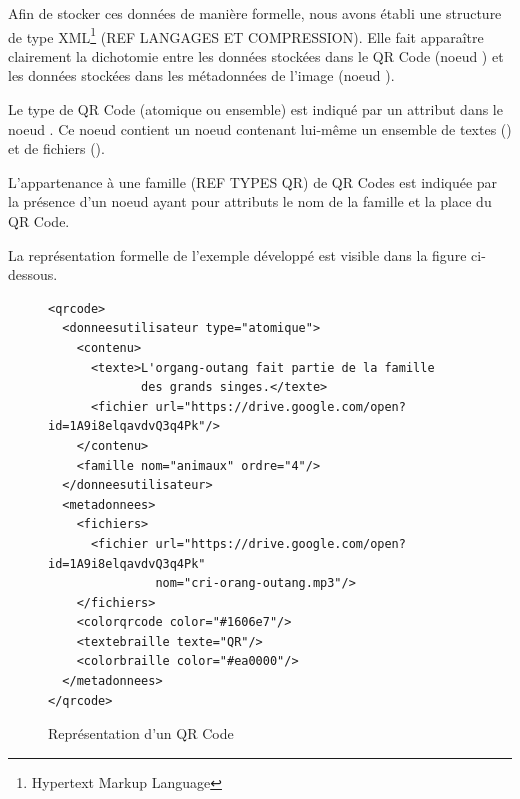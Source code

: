 \newpage
\par
Afin de stocker ces données de manière formelle, nous avons établi une structure de type XML\footnote{Hypertext Markup Language} (REF LANGAGES ET COMPRESSION). Elle fait apparaître clairement la dichotomie entre les données stockées dans le QR Code (noeud ) et les données stockées dans les métadonnées de l'image (noeud ).\\

\par
Le type de QR Code (atomique ou ensemble) est indiqué par un attribut dans le noeud . Ce noeud contient un noeud  contenant lui-même un ensemble de textes () et de fichiers ().
\par
L'appartenance à une famille (REF TYPES QR) de QR Codes est indiquée par la présence d'un noeud  ayant pour attributs le nom de la famille et la place du QR Code.\\

\par
La représentation formelle de l'exemple développé est visible dans la figure ci-dessous.

\begin{figure}[!h]
\begin{adjustbox}{minipage=\textwidth,bgcolor={RGB}{240 240 240}}

\lstset{language=XML}

\begin{lstlisting}
<qrcode>
  <donneesutilisateur type="atomique">
    <contenu>
      <texte>L'organg-outang fait partie de la famille 
             des grands singes.</texte>
      <fichier url="https://drive.google.com/open?id=1A9i8elqavdvQ3q4Pk"/>
    </contenu>
    <famille nom="animaux" ordre="4"/>
  </donneesutilisateur>
  <metadonnees>
    <fichiers>
      <fichier url="https://drive.google.com/open?id=1A9i8elqavdvQ3q4Pk"
               nom="cri-orang-outang.mp3"/>
    </fichiers>
    <colorqrcode color="#1606e7"/>
    <textebraille texte="QR"/>
    <colorbraille color="#ea0000"/>
  </metadonnees>
</qrcode>
\end{lstlisting}

\end{adjustbox}
\caption{Représentation d'un QR Code}

\end{figure}\textbf{}